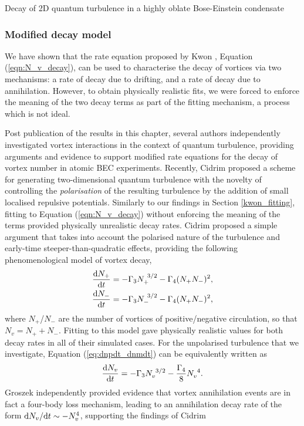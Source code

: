 \begin{chapter}{\label{cha:shin}Decay of 2D quantum turbulence in a highly oblate Bose-Einstein condensate}
\subsubsection{Modified decay model}
We have shown that the rate equation proposed by Kwon \etal \citep{kwon_moon_14}, Equation (\ref{eqn:N_v_decay}), can be used to characterise the decay of vortices via two mechanisms: a rate of decay due to drifting, and a rate of decay due to annihilation. However, to obtain physically realistic fits, we were forced to enforce the meaning of the two decay terms as part of the fitting mechanism, a process which is not ideal.%

Post publication \cite{stagg_allen_14} of the results in this chapter, several authors \cite{Cidrim15,Groszek15} independently investigated vortex interactions in the context of quantum turbulence, providing arguments and evidence to support modified rate equations for the decay of vortex number in atomic BEC experiments. Recently, Cidrim \etal \cite{Cidrim15} proposed a scheme for generating two-dimensional quantum turbulence with the novelty of controlling the {\it polarisation} of the resulting turbulence by the addition of small localised repulsive potentials. Similarly to our findings in Section \ref{kwon_fitting}, fitting to Equation (\ref{eqn:N_v_decay}) without enforcing the meaning of the terms provided physically unrealistic decay rates. Cidrim \etal proposed a simple argument that takes into account the polarised nature of the turbulence and early-time steeper-than-quadratic effects, providing the following phenomenological model of vortex decay,
\begin{align}
\begin{split}
  \frac{{\rm d}N_+}{{\rm d}t} &= -\Gamma_3 N_+^{~3/2} -\Gamma_4(N_+N_-)^{2},\\
  \frac{{\rm d}N_-}{{\rm d}t} &= -\Gamma_3 N_-^{~3/2} -\Gamma_4(N_+N_-)^{2},
\end{split}
\label{eq:dnpdt_dnmdt}
\end{align}
where $N_+$/$N_-$ are the number of vortices of positive/negative circulation, so that $N_v = N_+ + N_-$. Fitting to this model gave physically realistic values for both decay rates in all of their simulated cases. For the unpolarised turbulence that we investigate, Equation (\ref{eq:dnpdt_dnmdt}) can be equivalently written as
\begin{equation}
  \frac{{\rm d}N_v}{{\rm d}t} = -\Gamma_3 N_v^{~3/2} -\frac{\Gamma_4}{8}N_v^{~4}.
  \label{eqn:N_v_cidrim}
\end{equation}
Groszek \etal independently provided evidence \cite{Groszek15} that vortex annihilation events are in fact a four-body loss mechanism, leading to an annihilation decay rate of the form ${{\rm d}N_v}/{{\rm d}t}\sim -N_v^4$, supporting the findings of Cidrim \etal


\end{chapter}
